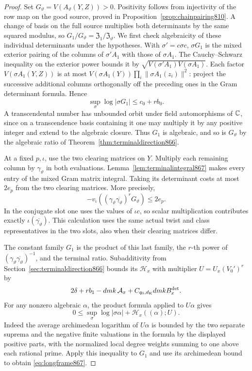\documentclass[a4paper,11pt]{article}
\theoremstyle{definition}
\theoremstyle{remark}
\numberwithin{equation}{section}
\begin{document}
\begin{proof}
Set \(G_\vartheta=V(A_\vartheta(Y,Z))>0\). Positivity follows
from injectivity of the row map on the good source, proved in
Proposition~\ref{prop:chainpairing810}. A change of basis on
the full source multiplies both determinants by the same
squared modulus, so \(G_1/G_\vartheta=\mathfrak Z_1/\mathfrak
Z_\vartheta\). We first check algebraicity of these individual
determinants under the hypotheses. With \(\sigma'=c\sigma c\),
\(\sigma G_1\) is the mixed exterior pairing of the columns of
\(\sigma' A_1\) with those of \(\sigma A_1\). The
Cauchy--Schwarz inequality on the exterior power bounds it
by \(\sqrt{V(\sigma' A_1)V(\sigma A_1)}\). Each factor
\(V(\sigma A_1(Y,Z))\) is at most
\(V(\sigma A_1(Y))\prod_i\|\sigma A_1(z_i)\|^2\): project the
successive additional columns orthogonally off the preceding
ones in the Gram determinant formula. Hence
\[
                      \sup_\sigma\log|\sigma G_1|\le c_0+r b_0.
\]
A transcendental number has unbounded orbit under field
automorphisms of \(\mathbb C\), since on a transcendence basis
containing it one may multiply it by any positive integer
and extend to the algebraic closure. Thus \(G_1\) is algebraic,
and so is \(G_\vartheta\) by the algebraic ratio of
Theorem~\ref{thm:terminaldirection866}.

At a fixed \(p,\iota\), use the two clearing matrices on
\(Y\). Multiply each remaining column by \(\gamma_\vartheta\)
in both evaluations. Lemma~\ref{lem:terminalintegral867}
makes every entry of the mixed Gram matrix integral.
Taking its determinant costs at most \(2e_p\) from the
two clearing matrices. More precisely,
\[
   -v_\iota\!\left((\gamma_\vartheta
       \overline{\gamma_\vartheta})^{r}G_\vartheta\right)
                           \le 2e_p .
\]
In the conjugate slot one uses the values of \(\iota c\),
so scalar multiplication contributes exactly
\(\iota(\overline{\gamma_\vartheta})\). This calculation
uses the same actual twist and class representatives in
the two slots, also when their clearing matrices differ.

The constant family \(G_1\) is the product of this last
family, the \(r\)-th power of
\((\gamma_\vartheta\overline{\gamma_\vartheta})^{-1}\),
and the terminal ratio. Subadditivity from
Section~\ref{sec:terminaldirection866} bounds its
\(\mathcal H_x\) with multiplier \(U=U_x(V_0')^r\) by
\[
 2\delta+r b_1-dmk\,\mathcal A_x
                               +C_{q_0,d_{\rm K}}dmk B_x^{\rm det}.
\]
For any nonzero algebraic \(\alpha\), the product formula
applied to \(U\alpha\) gives
\[
  0\le\sup_\sigma\log|\sigma\alpha|
                    +\mathcal H_x((\alpha);U).
\]
Indeed the average archimedean logarithm of \(U\alpha\)
is bounded by the two separate suprema and the negative
finite valuations in the formula by the displayed positive
parts, with the normalized local degree weights summing to
one above each rational prime. Apply this inequality to
\(G_1\) and use its archimedean bound to obtain
\eqref{eq:longframe867}.
\end{proof}
\end{document}
